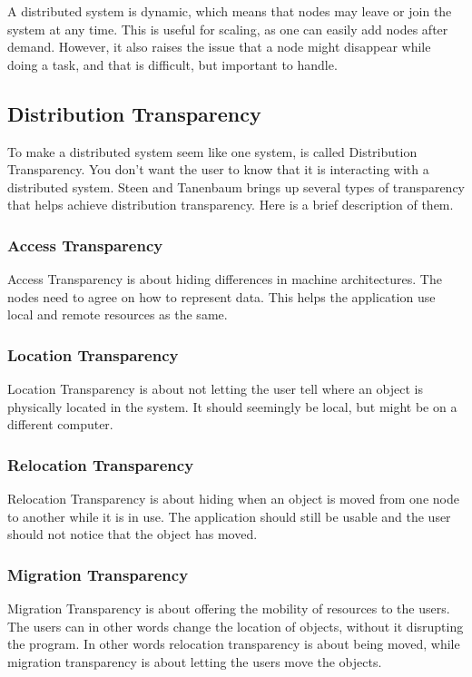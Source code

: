 A distributed system is dynamic, which means that nodes may leave or join the system at any time. This is useful for scaling, as one can easily add nodes after demand. However, it also raises the issue that a node might disappear while doing a task, and that is difficult, but important to handle.



\subsection{Distribution Transparency}
To make a distributed system seem like one system, is called Distribution Transparency. You don't want the user to know that it is interacting with a distributed system. Steen and Tanenbaum brings up several types of transparency that helps achieve distribution transparency. Here is a brief description of them.

\subsubsection{Access Transparency}
Access Transparency is about hiding differences in machine architectures. The nodes need to agree on how to represent data. This helps the application use local and remote resources as the same. 

\subsubsection{Location Transparency}
Location Transparency is about not letting the user tell where an object is physically located in the system. It should seemingly be local, but might be on a different computer.

\subsubsection{Relocation Transparency}
Relocation Transparency is about hiding when an object is moved from one node to another while it is in use. The application should still be usable and the user should not notice that the object has moved.

\subsubsection{Migration Transparency}
Migration Transparency is about offering the mobility of resources to the users. The users can in other words change the location of objects, without it disrupting the program. In other words relocation transparency is about being moved, while migration transparency is about letting the users move the objects.

